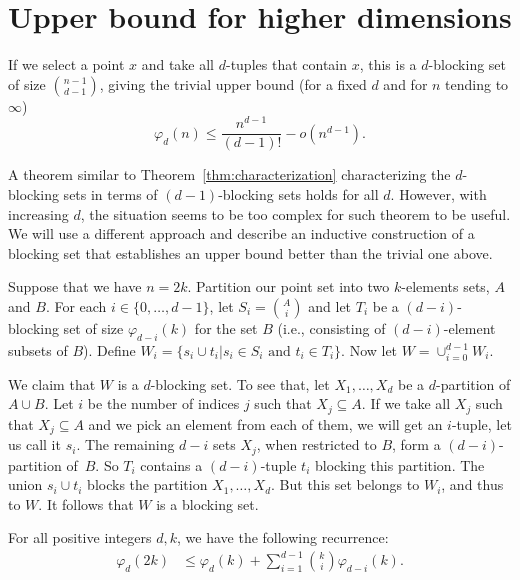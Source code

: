 \documentclass[11pt,a4paper]{article}
\begin{document}
\section{Upper bound for higher dimensions}\label{sec:ubhighd}

If we select a point $x$ and take all $d$-tuples that contain $x$, this is a $d$-blocking set of size $\binom{n-1}{d-1}$, giving the trivial upper bound (for a fixed $d$ and for $n$ tending to $\infty$)
\begin{equation}\label{eq:trivub}
 \varphi_d(n)\leq \frac{n^{d-1}}{(d-1)!} -o(n^{d-1}).
\end{equation}


A theorem similar to Theorem~\ref{thm:characterization} characterizing the $d$-blocking sets in terms of $(d-1)$-blocking sets holds for all $d$. However, with increasing $d$, the situation seems to be too complex for such theorem to be useful. We will use a different approach and describe an inductive construction of a blocking set that establishes an upper bound better than the trivial one above.




Suppose that we have $n=2k$. Partition our point set into two $k$-elements sets, $A$ and $B$. For each $i\in \{0,\dots,d-1\}$, let $S_i=\binom{A}{i}$ and let $T_i$ be a $(d-i)$-blocking set of size $\varphi_{d-i}(k)$ for the set $B$ (i.e., consisting of $(d-i)$-element subsets of $B$). Define $W_i=\{s_i \cup t_i|s_i\in S_i \mbox{ and }t_i\in T_i\}$. Now let $W=\cup_{i=0}^{d-1} W_i$.

We claim that $W$ is a $d$-blocking set. To see that, let $X_1,\dots,X_d$ be a $d$-partition of $A\cup B$. Let $i$ be the number of indices $j$ such that $X_j\subseteq A$. If we take all $X_j$ such that $X_j\subseteq A$ and we pick an element from each of them, we will get an $i$-tuple, let us call it $s_i$. The remaining $d-i$ sets $X_j$, when restricted to $B$, form a $(d-i)$-partition of~$B$. So $T_i$ contains a $(d-i)$-tuple $t_i$ blocking this partition. The union $s_i\cup t_i$ blocks the partition $X_1,\dots,X_d$. But this set belongs to $W_i$, and thus to $W$. It follows that $W$ is a blocking set.


\begin{lemma}
    For all positive integers $d,k$, we have the following recurrence:
    \begin{align}\label{formula3}
\varphi_d(2k) &\leq \varphi_d(k) + \sum_{i=1}^{d-1}\binom{k}{i}\varphi_{d-i}(k). %
\end{align}
\end{lemma}
\end{document}
